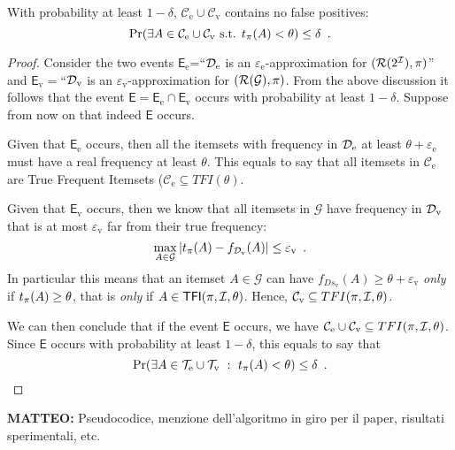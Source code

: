 \begin{theorem}
	With probability at least $1-\delta$,
	$\mathcal{C}_\mathrm{e}\cup\mathcal{C}_\mathrm{v}$ contains no false
	positives:
	\[
		\Pr(\exists A\in\mathcal{C}_\mathrm{e}\cup\mathcal{C}_\mathrm{v} \mbox{
		s.t. } t_\pi(A)<\theta)\le\delta\enspace.
	\]
\end{theorem}
\begin{proof}
  Consider the two events $\mathsf{E}_\mathrm{e}$=``${\cal D}_\mathrm{e}$ is an
  $\varepsilon_\mathrm{e}$-approximation for $(\mathcal{R}(2^{\cal I}),\pi)$'' and
  $\mathsf{E}_\mathrm{v}=$``${\cal D}_\mathrm{v}$ is an
  $\varepsilon_\mathrm{v}$-approximation for $(\mathcal{R}(\mathcal{G}),\pi)$. From
  the above discussion it follows that the event
  $\mathsf{E}=\mathsf{E}_\mathrm{e}\cap\mathsf{E}_\mathrm{v}$ occurs with probability at least
  $1-\delta$. Suppose from now on that indeed $\mathsf{E}$ occurs.

  Given that $\mathsf{E}_\mathrm{e}$ occurs, then all the itemsets with
  frequency in ${\cal D}_\mathrm{e}$ at least $\theta+\varepsilon_\mathrm{e}$
  must have a real frequency at least $\theta$. This equals to say that all
  itemsets in $\mathcal{C}_\mathrm{e}$ are True Frequent Itemsets
  ($\mathcal{C}_\mathrm{e}\subseteq TFI(\theta)$.

  Given that $\mathsf{E}_\mathrm{v}$ occurs, then we know that all itemsets in
  $\mathcal{G}$ have frequency in ${\cal D}_\mathrm{v}$ that is at most
  $\varepsilon_\mathrm{v}$ far from their true frequency:
  \[
  \max_{A\in\mathcal{G}}\left|t_\pi(A)-f_{{\cal D}_\mathrm{v}}(A)\right|\le\varepsilon_\mathrm{v}\enspace.\]
  In particular this means that an  itemset $A\in\mathcal{G}$ can have
  $f_{Ds_\mathrm{v}}(A)\ge\theta+\varepsilon_\mathrm{v}$ \emph{only} if
  $t_\pi(A)\ge\theta$, that is \emph{only} if $A\in\mathsf{TFI}(\pi,{\cal I},\theta)$.
  Hence, $\mathcal{C}_\mathrm{v}\subseteq TFI(\pi,{\cal I},\theta)$.

  We can then conclude that if the event $\mathsf{E}$ occurs, we have
  $\mathcal{C}_\mathrm{e}\cup \mathcal{C}_\mathrm{v}\subseteq TFI(\pi,{\cal I},\theta)$.
  Since $\mathsf{E}$ occurs with probability at least $1-\delta$, this equals to
  say that
  \[
  \Pr(\exists A\in \mathcal{T}_\mathrm{e}\cup
  \mathcal{T}_\mathrm{v} ~:~ t_\pi(A)<\theta)\le\delta\enspace.\]
\end{proof}

{\bf MATTEO:} Pseudocodice, menzione dell'algoritmo in giro per il paper,
risultati sperimentali, etc.
